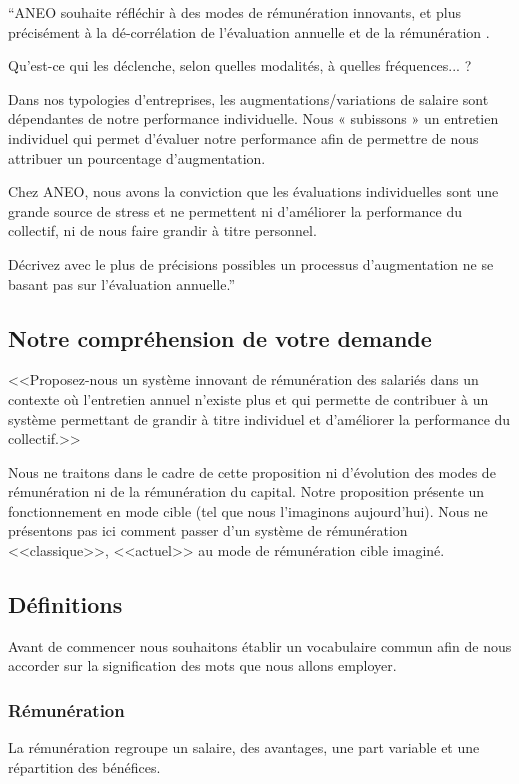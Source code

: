 \documentclass[12pt]{article}
\begin{document}
 “ANEO souhaite réfléchir à des modes de rémunération innovants, et plus précisément à la dé-corrélation de l’évaluation annuelle et de la rémunération \cite{Concours}.
 
 Qu’est-ce qui les déclenche, selon quelles modalités, à quelles fréquences... ?
 
 Dans nos typologies d’entreprises, les augmentations/variations de salaire sont dépendantes de notre performance individuelle. Nous « subissons » un entretien individuel qui permet d’évaluer notre performance afin de permettre de nous attribuer un pourcentage d’augmentation. 
 
 Chez ANEO, nous avons la conviction que les évaluations individuelles sont une grande source de stress et ne permettent ni d’améliorer la performance du collectif, ni de nous faire grandir à titre personnel.
 
 Décrivez avec le plus de précisions possibles un processus d’augmentation ne se basant pas sur l’évaluation annuelle.”

\subsection{Notre compréhension de votre demande}
 <<Proposez-nous un système innovant de rémunération des salariés dans un contexte où l’entretien annuel n’existe plus et qui permette de contribuer à un système permettant de grandir à titre individuel et d’améliorer la performance du collectif.>>

 Nous ne traitons dans le cadre de cette proposition ni d’évolution des modes de rémunération ni de la rémunération du capital. Notre proposition présente un fonctionnement en mode cible (tel que nous l’imaginons aujourd’hui). Nous ne présentons pas ici comment passer d’un système de rémunération <<classique>>, <<actuel>> au mode de rémunération cible imaginé.  

\subsection{Définitions}
 Avant de commencer nous souhaitons établir un vocabulaire commun afin de nous accorder sur la signification des mots que nous allons employer.

\subsubsection{Rémunération} 
 La rémunération regroupe un salaire, des avantages, une part variable et une répartition des bénéfices.
\end{document}
